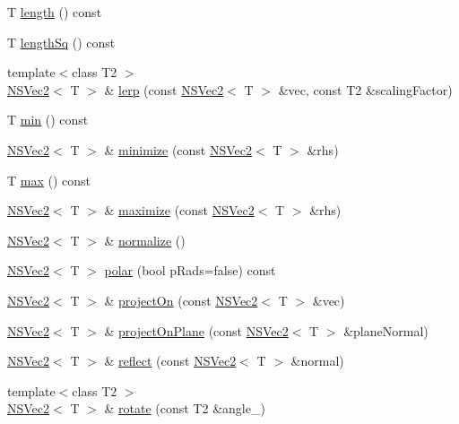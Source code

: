 \begin{DoxyCompactItemize}
\item 
T \hyperlink{structNSVec2_abb5871b6bd583ec63305eaeb307dc22e}{length} () const 
\item 
T \hyperlink{structNSVec2_a2051a5ed908c2a9e31da54882aadd07a}{length\-Sq} () const 
\item 
{\footnotesize template$<$class T2 $>$ }\\\hyperlink{structNSVec2}{N\-S\-Vec2}$<$ T $>$ \& \hyperlink{structNSVec2_ada858524157467c103e8a3a955e343f1}{lerp} (const \hyperlink{structNSVec2}{N\-S\-Vec2}$<$ T $>$ \&vec, const T2 \&scaling\-Factor)
\item 
T \hyperlink{structNSVec2_a5d4653fc279e66b989e2160e2aebd25d}{min} () const 
\item 
\hyperlink{structNSVec2}{N\-S\-Vec2}$<$ T $>$ \& \hyperlink{structNSVec2_a61fe535f93d85752637d99c1073cb232}{minimize} (const \hyperlink{structNSVec2}{N\-S\-Vec2}$<$ T $>$ \&rhs)
\item 
T \hyperlink{structNSVec2_a57fd7b8ac14ec79bc5ced6f6de3c5307}{max} () const 
\item 
\hyperlink{structNSVec2}{N\-S\-Vec2}$<$ T $>$ \& \hyperlink{structNSVec2_a4c1d458d15fec5f0268865fc4020e41f}{maximize} (const \hyperlink{structNSVec2}{N\-S\-Vec2}$<$ T $>$ \&rhs)
\item 
\hyperlink{structNSVec2}{N\-S\-Vec2}$<$ T $>$ \& \hyperlink{structNSVec2_a5a31bfa6e07ab97689eece4290e72a6e}{normalize} ()
\item 
\hyperlink{structNSVec2}{N\-S\-Vec2}$<$ T $>$ \hyperlink{structNSVec2_a3d1d91c1c65aeffb93ba54784e44a21b}{polar} (bool p\-Rads=false) const 
\item 
\hyperlink{structNSVec2}{N\-S\-Vec2}$<$ T $>$ \& \hyperlink{structNSVec2_a3086e2c38c74b80b325fdc18254691c5}{project\-On} (const \hyperlink{structNSVec2}{N\-S\-Vec2}$<$ T $>$ \&vec)
\item 
\hyperlink{structNSVec2}{N\-S\-Vec2}$<$ T $>$ \& \hyperlink{structNSVec2_a955b1873c709c04452ce7301b521e2d5}{project\-On\-Plane} (const \hyperlink{structNSVec2}{N\-S\-Vec2}$<$ T $>$ \&plane\-Normal)
\item 
\hyperlink{structNSVec2}{N\-S\-Vec2}$<$ T $>$ \& \hyperlink{structNSVec2_a0a6afa4e3d2c3fe6a1b60e3bb7e0f206}{reflect} (const \hyperlink{structNSVec2}{N\-S\-Vec2}$<$ T $>$ \&normal)
\item 
{\footnotesize template$<$class T2 $>$ }\\\hyperlink{structNSVec2}{N\-S\-Vec2}$<$ T $>$ \& \hyperlink{structNSVec2_a81915be34d888fd6b5581334d28627bd}{rotate} (const T2 \&angle\-\_\-)

\end{DoxyCompactItemize}

